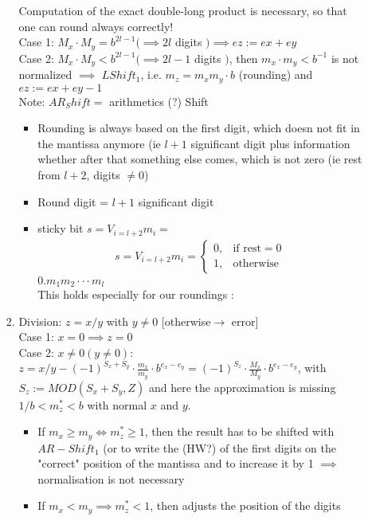 \begin{itemize}
\begin{enumerate}
\begin{enumerate}
Computation of the exact double-long product is necessary, so that one can round always correctly! \\
Case 1: $M_x\cdot M_y=b^{2l-1} (\implies 2l$ digits $)\implies ez:=ex+ey$ \\
Case 2: $M_x\cdot M_y<b^{2l-1} (\implies 2l-1$ digits $)$, then $m_x\cdot m_y<b^{-1}$ is not normalized $\implies$ $LShift_1$, i.e. $m_z=m_xm_y\cdot b$ (rounding) and $ez:=ex+ey-1$\\
Note: $AR_Shift =$ arithmetics (?) Shift 
\begin{itemize}
	\item Rounding is always based on the first digit, which doesn not fit in the mantissa anymore (ie $l + 1$ significant digit plus information whether after that something else comes, which is not zero (ie rest from $l + 2$, digits $\not = 0$)
	\item Round digit = $l+1$ significant digit
	\item sticky bit $s=V_{i=l+2}m_i =$
	\begin{align*}
		s=V_{i=l+2}m_i =
		\begin{cases}
			0, & \text{if rest}=0\\
			1,  & \text{otherwise}
		\end{cases}
	\end{align*}
	$0.m_1m_2 \cdot \cdot \cdot m_l $\\ 
	This holds especially for our roundings :
\end{itemize}
\item Division: $z=x/y$ with $y\not=0$ [otherwise$\to$ error] \\
Case 1: $x=0 \implies z=0$ \\
Case 2: $x\not = 0 (y\not =0):$ \\
$z=x/y-(-1)^{S_x+S_y}\cdot \frac{m_x}{m_y}\cdot b^{e_x-e_y}=(-1)^{S_z}\cdot \frac{M_x}{M_y}\cdot b^{e_x-e_y}$, with $S_z:=MOD(S_x+S_y,Z)$ and here the approximation is missing 
\\
$1/b<m_z^*<b$ with normal $x$ and $y$.\\
\begin{itemize}
	\item If $m_x\ge m_y \iff m_z^*\ge 1$, then the result has to be shifted with $AR-Shift_1$ (or to write the (HW?) of the first digits on the "correct" position of the mantissa and to increase it by 1 $\implies$ normalisation is not necessary
	\item If $m_x<m_y \implies m_z^*<1$, then adjusts the position of the digits 

\end{itemize}
\end{enumerate}
\end{enumerate}
\end{itemize}
